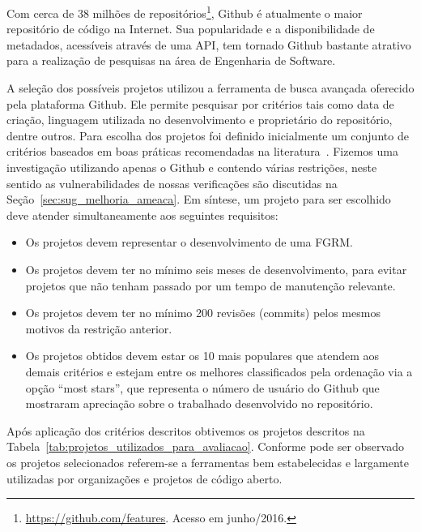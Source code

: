 Com cerca de 38 milhões de
repositórios\footnote{\url{https://github.com/features}. Acesso em junho/2016.},
Github é atualmente o maior repositório de código na Internet. Sua popularidade
e a disponibilidade de metadados, acessíveis através de uma API, tem tornado
Github bastante atrativo para a realização de pesquisas na área de Engenharia de
Software.

A seleção dos possíveis projetos utilizou a ferramenta de busca avançada
oferecido pela plataforma Github. Ele permite pesquisar por critérios tais como
data de criação, linguagem utilizada no desenvolvimento e proprietário do
repositório, dentre outros. Para escolha dos projetos foi definido inicialmente
um conjunto de critérios baseados em boas práticas recomendadas na
literatura~\cite{Bird2009}. Fizemos uma investigação utilizando apenas o Github
e contendo várias restrições, neste sentido as vulnerabilidades de nossas
verificações são discutidas na Seção~\ref{sec:sug_melhoria_ameaca}. Em síntese,
um projeto para ser escolhido deve atender simultaneamente aos seguintes
requisitos:

\begin{itemize}
	\item Os projetos devem representar o desenvolvimento de uma FGRM\@.
	\item Os projetos devem ter no mínimo seis meses de desenvolvimento, para
		evitar projetos que não tenham passado por um tempo de manutenção
		relevante.
	\item Os projetos devem  ter  no  mínimo  200  revisões (commits)  pelos
		mesmos motivos  da restrição anterior.
    \item Os projetos obtidos devem estar os 10 mais populares que atendem aos
        demais critérios e estejam entre os melhores classificados pela
        ordenação via a opção ``most stars'', que representa o número de usuário
        do Github que mostraram apreciação sobre o trabalhado desenvolvido no
        repositório.
\end{itemize}

Após aplicação dos critérios descritos obtivemos os projetos descritos na
Tabela~\ref{tab:projetos_utilizados_para_avaliacao}. Conforme pode ser observado
os projetos selecionados referem-se a ferramentas bem estabelecidas e largamente
utilizadas por organizações e projetos de código aberto.

\begin{table}[htpb]
\centering
{}
\caption{Projetos utilizados no levantamento com profissionais. Os dados
	apresentados tem como referência 07/03/2017.}
\label{tab:projetos_utilizados_para_avaliacao}
\end{table}

